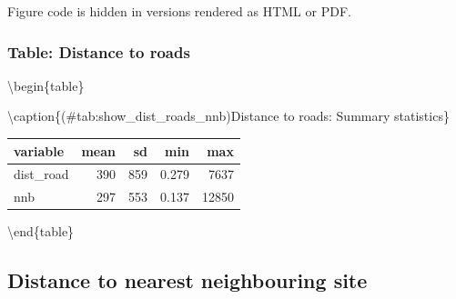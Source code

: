 \documentclass[]{article}
\newenvironment{Shaded}{}{}
\newcommand{\CommentTok}[1]{\textcolor[rgb]{0.00,0.50,0.00}{#1}}
\newcommand{\DataTypeTok}[1]{#1}
\newcommand{\KeywordTok}[1]{\textcolor[rgb]{0.00,0.00,1.00}{#1}}
\newcommand{\NormalTok}[1]{#1}
\newcommand{\OperatorTok}[1]{#1}
\newcommand{\StringTok}[1]{\textcolor[rgb]{0.00,0.50,0.50}{#1}}
\begin{document}
Figure code is hidden in versions rendered as HTML or PDF.

\hypertarget{table-distance-to-roads}{%
\subsubsection{Table: Distance to roads}\label{table-distance-to-roads}}

\begin{Shaded}
\end{Shaded}

\textbackslash{}begin\{table\}

\textbackslash{}caption\{(\#tab:show\_dist\_roads\_nnb)Distance to roads: Summary statistics\}
\centering

\begin{tabular}[t]{lrrrr}
\toprule
variable & mean & sd & min & max\\
\midrule
dist\_road & 390 & 859 & 0.279 & 7637\\
nnb & 297 & 553 & 0.137 & 12850\\
\bottomrule
\end{tabular}

\textbackslash{}end\{table\}

\hypertarget{distance-to-nearest-neighbouring-site}{%
\subsection{Distance to nearest neighbouring site}\label{distance-to-nearest-neighbouring-site}}
\end{document}
